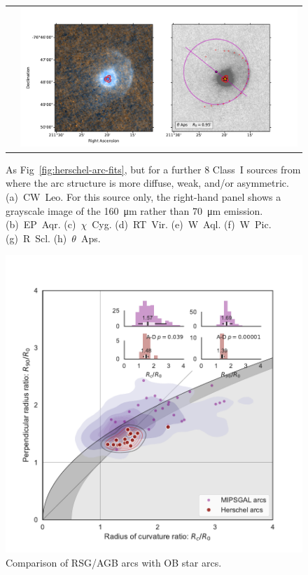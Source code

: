 \begin{figure}
\begin{tabular}{@{}ll@{}}
    & \includegraphics[trim=10 0 60 30, clip]{figs/tetaps-imageplot}
  \end{tabular}
  \caption{As Fig~\ref{fig:herschel-arc-fits}, but for a further 8
    Class~I sources from \citet{Cox:2012a} where the arc structure is
    more diffuse, weak, and/or asymmetric. (a)~CW~Leo. For this source
    only, the right-hand panel shows a grayscale image of the
    \SI{160}{\um} rather than \SI{70}{\um}
    emission. (b)~EP~Aqr. (c)~\(\chi\)~Cyg. (d)~RT~Vir. (e)~W~Aql. (f)~W~Pic. (g)~R~Scl.
    (h)~\(\theta\)~Aps.}
  \label{fig:herschel-arc-fits-poor}
\end{figure}


\begin{figure}
  \centering
  \includegraphics[width=\linewidth]{figs/mipsgal-Rc-R90-vs-Herschel}
  \caption[]{Comparison of RSG/AGB arcs with OB star arcs.}
  \label{fig:herschel-compare-mipsgal}
\end{figure}

